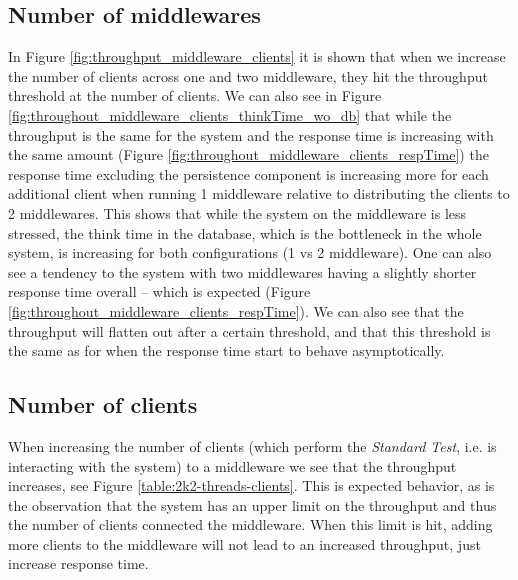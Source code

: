 \documentclass{article}
\begin{document}
        \subsection{Number of middlewares}
		   In Figure \ref{fig:throughput_middleware_clients} it is shown that when we increase the number of clients across one and two middleware, they hit the throughput threshold at the number of clients. We can also see in Figure \ref{fig:throughout_middleware_clients_thinkTime_wo_db} that while the throughput is the same for the system and the response time is increasing with the same amount (Figure \ref{fig:throughout_middleware_clients_respTime}) the response time excluding the persistence component is increasing more for each additional client when running 1 middleware relative to distributing the clients to 2 middlewares. This shows that while the system on the middleware is less stressed, the think time in the database, which is the bottleneck in the whole system, is increasing for both configurations (1 vs 2 middleware). One can also see a tendency to the system with two middlewares having a slightly shorter response time overall -- which is expected (Figure \ref{fig:throughout_middleware_clients_respTime}). We can also see that the throughput will flatten out after a certain threshold, and that this threshold is the same as for when the response time start to behave asymptotically.

        \subsection{Number of clients}
        When increasing the number of clients (which perform the \textit{Standard Test}, i.e. is interacting with the system) to a middleware we see that the throughput increases, see Figure \ref{table:2k2-threads-clients}. This is expected behavior, as is the observation that the system has an upper limit on the throughput and thus the number of clients connected the middleware. When this limit is hit, adding more clients to the middleware will not lead to an increased throughput, just increase response time.
\end{document}
